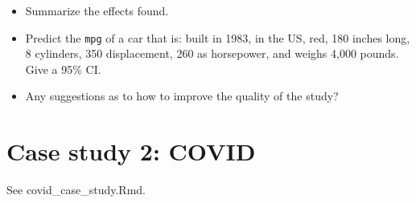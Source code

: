 \documentclass[
]{article}
\providecommand{\tightlist}{%
  \setlength{\itemsep}{0pt}\setlength{\parskip}{0pt}}
\begin{document}
\begin{itemize}
\tightlist
\item
  Summarize the effects found.
\item
  Predict the \texttt{mpg} of a car that is: built in 1983, in the US,
  red, 180 inches long, 8 cylinders, 350 displacement, 260 as
  horsepower, and weighs 4,000 pounds. Give a 95\% CI.
\item
  Any suggestions as to how to improve the quality of the study?
\end{itemize}

\hypertarget{case-study-2-covid}{%
\section{Case study 2: COVID}\label{case-study-2-covid}}

See covid\_case\_study.Rmd.
\end{document}
